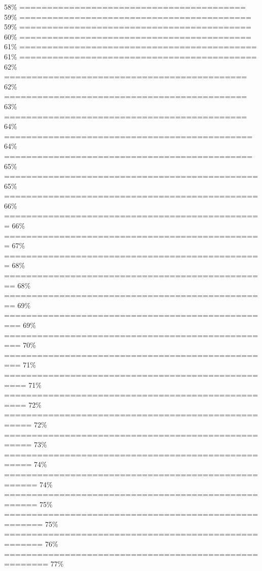 \documentclass[
]{article}
\begin{document}
58\% \textbar{} \textbar=========================================
\textbar{} 59\% \textbar{}
\textbar========================================== \textbar{} 59\%
\textbar{} \textbar========================================== \textbar{}
60\% \textbar{} \textbar==========================================
\textbar{} 61\% \textbar{}
\textbar=========================================== \textbar{} 61\%
\textbar{} \textbar===========================================
\textbar{} 62\% \textbar{}
\textbar============================================ \textbar{} 62\%
\textbar{} \textbar============================================
\textbar{} 63\% \textbar{}
\textbar============================================ \textbar{} 64\%
\textbar{} \textbar=============================================
\textbar{} 64\% \textbar{}
\textbar============================================= \textbar{} 65\%
\textbar{} \textbar==============================================
\textbar{} 65\% \textbar{}
\textbar============================================== \textbar{} 66\%
\textbar{} \textbar===============================================
\textbar{} 66\% \textbar{}
\textbar=============================================== \textbar{} 67\%
\textbar{} \textbar===============================================
\textbar{} 68\% \textbar{}
\textbar================================================ \textbar{} 68\%
\textbar{} \textbar================================================
\textbar{} 69\% \textbar{}
\textbar================================================= \textbar{}
69\% \textbar{}
\textbar================================================= \textbar{}
70\% \textbar{}
\textbar================================================= \textbar{}
71\% \textbar{}
\textbar================================================== \textbar{}
71\% \textbar{}
\textbar================================================== \textbar{}
72\% \textbar{}
\textbar=================================================== \textbar{}
72\% \textbar{}
\textbar=================================================== \textbar{}
73\% \textbar{}
\textbar=================================================== \textbar{}
74\% \textbar{}
\textbar==================================================== \textbar{}
74\% \textbar{}
\textbar==================================================== \textbar{}
75\% \textbar{}
\textbar===================================================== \textbar{}
75\% \textbar{}
\textbar===================================================== \textbar{}
76\% \textbar{}
\textbar======================================================
\textbar{} 77\% \textbar{}
\end{document}
